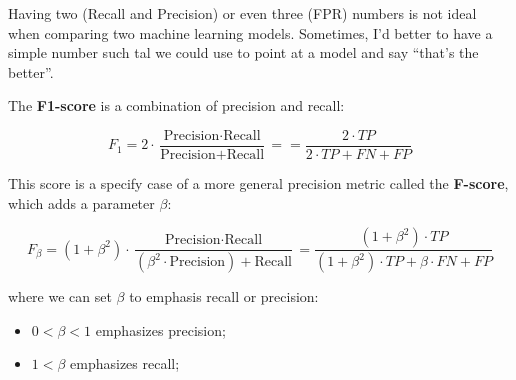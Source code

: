 \documentclass[12pt, a4paper, oneside]{article}
\begin{document}
Having two (Recall and Precision) or even three (FPR) numbers is not ideal when
comparing two machine learning models. Sometimes, I'd better to have a simple
number such tal we could use to point at a model and say ``that's the better''.

The \textbf{F1-score} is a combination of precision and recall:

\[ F_1 = 2\cdot\dfrac{\textrm{Precision}\cdot
        \textrm{Recall}}{\textrm{Precision} + \textrm{Recall}} =
= \dfrac{2\cdot TP}{2\cdot TP+FN+FP} \]

This score is a specify case of a more general precision metric called the
\textbf{F-score}, which adds a parameter $\beta$:

\[ F_\beta = (1+\beta^2)\cdot\dfrac{\textrm{Precision}\cdot\textrm{Recall}}
{(\beta^2\cdot\textrm{Precision}) + \textrm{Recall}} =
\dfrac{(1+\beta^2)\cdot TP}{(1+\beta^2)\cdot TP + \beta\cdot FN + FP} \]

where we can set $\beta$ to emphasis recall or precision:
\begin{itemize}
  \item $0<\beta<1$ emphasizes precision;
  \item $1<\beta$ emphasizes recall;
\end{itemize}

\end{document}
